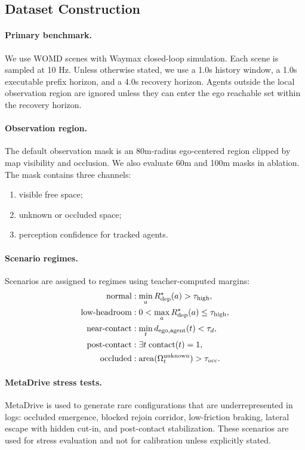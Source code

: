 \documentclass[conference]{IEEEtran}
\begin{document}
\subsection{Dataset Construction}
\label{app:dataset}

\paragraph{Primary benchmark.}
We use WOMD scenes with Waymax closed-loop simulation.  Each scene is sampled at 10 Hz.  Unless otherwise stated, we use a 1.0s history window, a 1.0s executable prefix horizon, and a 4.0s recovery horizon.  Agents outside the local observation region are ignored unless they can enter the ego reachable set within the recovery horizon.

\paragraph{Observation region.}
The default observation mask is an 80m-radius ego-centered region clipped by map visibility and occlusion.  We also evaluate 60m and 100m masks in ablation.  The mask contains three channels:
\begin{enumerate}[leftmargin=*]
    \item visible free space;
    \item unknown or occluded space;
    \item perception confidence for tracked agents.
\end{enumerate}

\paragraph{Scenario regimes.}
Scenarios are assigned to regimes using teacher-computed margins:
\begin{align}
    \text{normal} &: \min_a R_{\rm dep}^{\star}(a) > \tau_{\rm high}, \\
    \text{low-headroom} &: 0 < \max_a R_{\rm dep}^{\star}(a) \leq \tau_{\rm high}, \\
    \text{near-contact} &: \min_t d_{\rm ego,agent}(t) < \tau_d, \\
    \text{post-contact} &: \exists t \; \mathrm{contact}(t)=1, \\
    \text{occluded} &: \mathrm{area}(\Omega_t^{\rm unknown}) > \tau_{\rm occ}.
\end{align}

\paragraph{MetaDrive stress tests.}
MetaDrive is used to generate rare configurations that are underrepresented in logs: occluded emergence, blocked rejoin corridor, low-friction braking, lateral escape with hidden cut-in, and post-contact stabilization.  These scenarios are used for stress evaluation and not for calibration unless explicitly stated.
\end{document}
